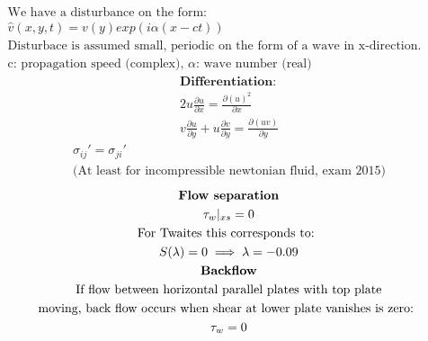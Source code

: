 \documentclass[10pt, a4paper]{article}
\newcommand{\derivative}[2]{\frac{\partial #1}{\partial #2}}
\begin{document}
\begin{multicols*}{2}
\begin{gather*}
        \text{We have a disturbance on the form: } \\
        \hat{v}(x,y,t) = v(y)exp(i\alpha(x - ct)) \\
        \text{Disturbace is assumed small, periodic on the form of a wave in x-direction. Amplitude only dependant of y.} \\
        \text{c: propagation speed (complex), $\alpha$: wave number (real)}
    \end{gather*}
    \begin{gather*}
        \textbf{Differentiation:} \\
        2u\derivative{u}{x} = \derivative{(u)^2}{x} \\
        v\derivative{u}{y} + u\derivative{v}{y} = \derivative{(uv)}{y}
    \end{gather*}
    \begin{gather*}
        \sigma_{ij}' = \sigma_{ji}' \\
        \text{(At least for incompressible newtonian fluid, exam 2015)}
    \end{gather*}
    \begin{gather*}
        \textbf{Flow separation} \\
        \tau_{w}\arrowvert_{xs} = 0 \\
        \text{For Twaites this corresponds to: } \\
        S(\lambda) = 0 \implies \lambda = -0.09 \\
        \textbf{Backflow} \\
        \text{If flow between horizontal parallel plates with top plate} \\
        \text{moving, back flow occurs when shear at lower plate vanishes is zero: } \\
        \tau_{w} = 0
    \end{gather*}
\end{multicols*}
\end{document}
